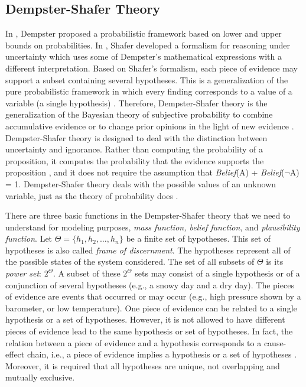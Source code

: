\documentclass[11pt]{article}
\begin{document}
\subsection{Dempster-Shafer Theory}
\label{sec:dst}

In \cite{dempster:theory}, Dempster proposed a probabilistic framework based on
lower and upper bounds on probabilities. In \cite{shafer:evidence-theory},
Shafer developed a formalism for reasoning under uncertainty which uses some of
Dempster's mathematical expressions with a different interpretation. Based on
Shafer's formalism, each piece of evidence may support a subset containing
several hypotheses. This is a generalization of the pure probabilistic framework
in which every finding corresponds to a value of a variable (a single
hypothesis) \cite{diez:reasoning-uncertainty}. Therefore, Dempster-Shafer theory
is the generalization of the Bayesian theory of subjective probability to
combine accumulative evidence or to change prior opinions in the light of new
evidence \cite{das:decision-making-agents}. Dempster-Shafer theory is designed
to deal with the distinction between uncertainty and ignorance. Rather than
computing the probability of a proposition, it computes the probability that the
evidence supports the proposition \cite{russell:ai-modern}, and it does not
require the assumption that \textit{Belief}(A) + \textit{Belief}($\neg$A) = 1.
Dempster-Shafer theory deals with the possible values of an unknown variable,
just as the theory of probability does \cite{tanimoto:ai-lisp}.

There are three basic functions in the Dempster-Shafer theory that we need to
understand for modeling purposes, \textit{mass function, belief function}, and
\textit{plausibility function}. Let $\Theta=\{h_1,h_2, \ldots, h_n\}$ be a
finite set of hypotheses. This set of hypotheses is also called \textit{frame of
discernment}. The hypotheses represent all of the possible states of the system
considered. The set of all subsets of $\Theta$ is its \textit{power set}:
$2^\Theta$. A subset of these $2^\Theta$ sets may consist of a single hypothesis
or of a conjunction of several hypotheses (e.g., a snowy day and a dry day). The
pieces of evidence are events that occurred or may occur (e.g., high pressure
shown by a barometer, or low temperature). One piece of evidence can be related
to a single hypothesis or a set of hypotheses. However, it is not allowed to
have different pieces of evidence lead to the same hypothesis or set of
hypotheses. In fact, the relation between a piece of evidence and a hypothesis
corresponds to a cause-effect chain, i.e., a piece of evidence implies a
hypothesis or a set of hypotheses \cite{kay:dst-reliability}. Moreover, it is
required that all hypotheses are unique, not overlapping and mutually exclusive.
\end{document}
